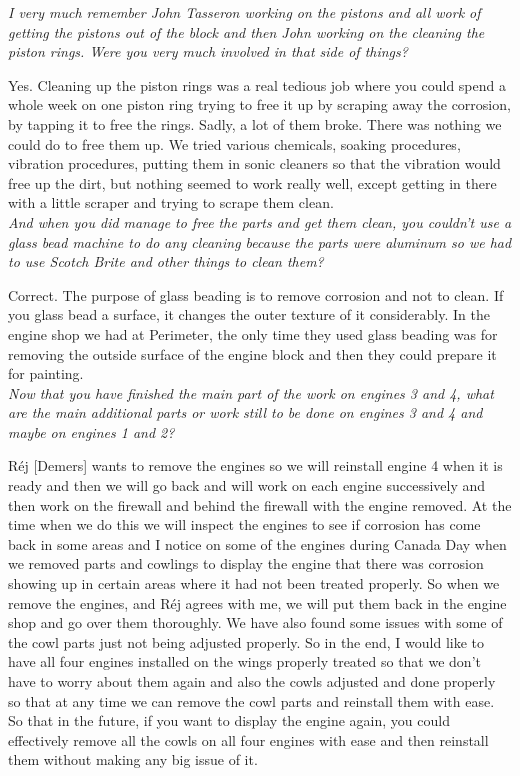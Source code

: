 \noindent\textit{I very much remember John Tasseron working on the pistons and
all work of getting the pistons out of the block  and then John working on the
cleaning the piston rings.  Were you very much involved in that side of things?}

Yes.  Cleaning up the piston rings was a real tedious job where you could spend
a whole week on one piston ring trying to free it up by scraping away the
corrosion, by tapping it to free the rings.  Sadly, a lot of them broke.  There
was nothing we could do to free them up.  We tried various chemicals, soaking
procedures, vibration procedures, putting them in sonic cleaners so that the
vibration would free up the dirt, but nothing seemed to work really well, except
getting in there with a little scraper and trying to scrape them clean.\\

\noindent\textit{And when you did manage to free the parts and get them clean,
you couldn't use a glass bead machine to do any cleaning because the parts were
aluminum so we had to use Scotch Brite and other things to clean them?}

Correct.  The purpose of glass beading is to remove corrosion and not to clean.
If you glass bead a surface, it changes the outer texture of it considerably. In
the engine shop we had at Perimeter, the only time they used glass beading was
for removing the outside surface of the engine block and then they could prepare
it for painting.\\

\noindent\textit{Now that you have finished the main part of the work on engines
3 and 4, what are the main additional parts or work still to be done on engines
3 and 4 and maybe on engines 1 and 2?}

R\'{e}j [Demers] wants to remove the engines so we will reinstall engine 4 when
it is ready and then we will go back and will work on each engine successively
and then work on the firewall and behind the firewall with the engine removed.
At the time when we do this we will inspect the engines to see if corrosion has
come back in some areas and I notice on some of the engines during Canada Day
when we removed parts and cowlings to display the engine that there was
corrosion showing up in certain areas where it had not been treated properly.
So when we remove the engines, and R\'{e}j agrees with me, we will put them back
in the engine shop and go over them thoroughly.  We have also found some issues
with some of the cowl parts just not being adjusted properly.  So in the end, I
would like to have all four engines installed on the wings properly treated so
that we don't have to worry about them again and also the cowls adjusted and
done properly so that at any time we can remove the cowl parts and reinstall
them with ease.  So that in the future, if you want to display the engine again,
you could effectively remove all the cowls on all four engines with ease and
then reinstall them without making any big issue of it.\\

